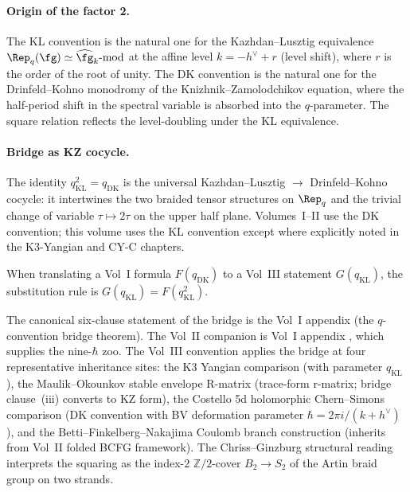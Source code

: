 \paragraph{Origin of the factor 2.}
The KL convention is the natural one for the Kazhdan--Lusztig equivalence
$\Rep_q(\fg) \simeq \widehat{\fg}_k\text{-mod}$ at the affine level
$k = -h^{\vee} + r$ (level shift), where $r$ is the order of the root of
unity. The DK convention is the natural one for the Drinfeld--Kohno
monodromy of the Knizhnik--Zamolodchikov equation, where the half-period
shift in the spectral variable is absorbed into the $q$-parameter. The
square relation reflects the level-doubling under the KL equivalence.

\paragraph{Bridge as KZ cocycle.}
The identity $q_{\mathrm{KL}}^2 = q_{\mathrm{DK}}$ is the universal
Kazhdan--Lusztig $\to$ Drinfeld--Kohno cocycle: it intertwines the two
braided tensor structures on $\Rep_q$ and the trivial change of variable
$\tau \mapsto 2 \tau$ on the upper half plane. Volumes~I--II use the DK
convention; this volume uses the KL convention except where explicitly noted
in the K3-Yangian and CY-C chapters.

When translating a Vol~I formula
$F(q_{\mathrm{DK}})$ to a Vol~III statement $G(q_{\mathrm{KL}})$, the
substitution rule is $G(q_{\mathrm{KL}}) = F(q_{\mathrm{KL}}^2)$.

\begin{remark}
\label{rem:q-bridge-v3-vol1-pointer}
The canonical six-clause statement of the bridge is the Vol~I appendix
\cite{VolI}
(the $q$-convention bridge theorem). The Vol~II companion is
Vol~I appendix \cite{VolI},
which supplies the nine-$\hbar$ zoo. The Vol~III convention applies the bridge
at four representative inheritance sites: the K3 Yangian comparison
(with parameter $q_{\mathrm{KL}}$), the
Maulik--Okounkov stable envelope R-matrix
(trace-form r-matrix; bridge clause~\textup{(iii)} converts to KZ form), the
Costello 5d holomorphic Chern--Simons comparison (DK convention with BV
deformation parameter $\hbar = 2 \pi i / (k + h^{\vee})$), and the
Betti--Finkelberg--Nakajima Coulomb branch construction (inherits from Vol~II
folded BCFG framework). The Chriss--Ginzburg structural reading
interprets the squaring as the index-$2$
$\mathbb{Z}/2$-cover $B_2 \to S_2$ of the Artin braid group on two strands.
\end{remark}


